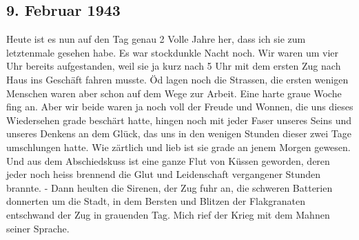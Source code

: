 \subsection{9. Februar 1943}

Heute ist es nun auf den Tag genau 2 Volle Jahre her, dass ich sie zum letztenmale gesehen habe.
Es war stockdunkle Nacht noch.
Wir waren um vier Uhr bereits aufgestanden, weil sie ja kurz nach 5 Uhr mit dem ersten Zug nach Haus ins Gesch\"{a}ft fahren musste.
\"{O}d lagen noch die Strassen, die ersten wenigen Menschen waren aber schon auf dem Wege zur Arbeit.
Eine harte graue Woche fing an.
Aber wir beide waren ja noch voll der Freude und Wonnen, die uns dieses Wiedersehen grade besch\"{a}rt hatte, hingen noch mit jeder Faser unseres Seins und unseres Denkens an dem Gl\"{u}ck, das uns in den wenigen Stunden dieser zwei Tage umschlungen hatte.
Wie z\"{a}rtlich und lieb ist sie grade an jenem Morgen gewesen.
Und aus dem Abschiedskuss ist eine ganze Flut von K\"{u}ssen geworden, deren jeder noch heiss brennend die Glut und Leidenschaft vergangener Stunden brannte.
- Dann heulten die Sirenen, der Zug fuhr an, die schweren Batterien donnerten um die Stadt, in dem Bersten und Blitzen der Flakgranaten entschwand der Zug in grauenden Tag.
Mich rief der Krieg mit dem Mahnen seiner Sprache.

\clearpage
